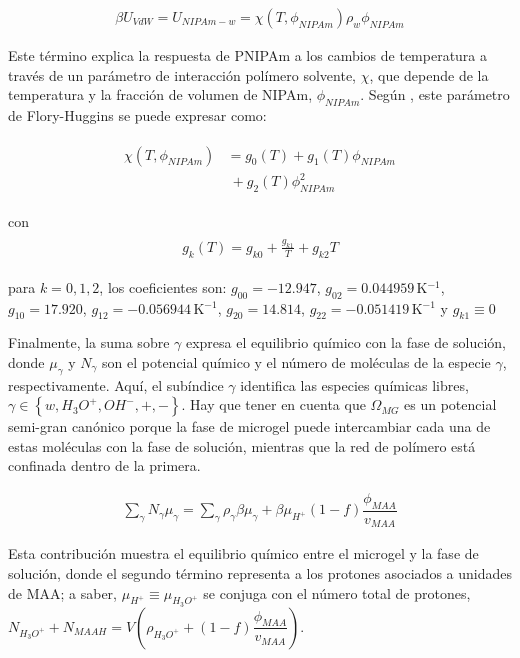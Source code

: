 \begin{align}
	\beta U_{VdW} = U_{NIPAm-w} = \chi (T, \phi_{NIPAm})\rho_w \phi_{NIPAm}
\end{align}


Este  t\'ermino explica la respuesta de PNIPAm a los cambios de temperatura a trav\'es de un par\'ametro de interacci\'on pol\'imero solvente, $\chi$, que depende de la temperatura y la fracci\'on de volumen de NIPAm, $\phi_{NIPAm}$.
Seg\'un  \citet{afroze2000}, este par\'ametro de Flory-Huggins se puede expresar como:
%
%


\begin{align}
	\begin{aligned}
		\chi (T, \phi_{NIPAm}) &=g_0(T) +g_1(T)\phi_{NIPAm} \\
		&~+ g_2(T)\phi_{NIPAm}^2
	\end{aligned}
\end{align}

\noindent con
%
%
\begin{align}
	\begin{aligned} 
		g_k(T)=g_{k0} + \frac{g_{k1}}{T} + g_{k2}T
	\end{aligned}
\end{align}


\noindent para  $k=0,1,2$, los coeficientes son: $g_{00}= -12.947$, $g_{02}=0.044959\,$K$^{-1}$, $g_{10}= 17.920$, $g_{12}= -0.056944$\,K$^{-1}$, $g_{20}= 14.814$, $g_{22}= -0.051419$\,K$^{-1}$  y $g_{k1}\equiv 0$ \cite{afroze2000}




Finalmente, la suma sobre  $\gamma$ expresa el equilibrio qu\'imico con la fase de soluci\'on, donde $\mu_\gamma$ y $N_\gamma$ son el potencial qu\'imico y el n\'umero de mol\'eculas de la especie $\gamma$, respectivamente.
Aqu\'i, el subíndice $\gamma$ identifica  las especies qu\'imicas libres, $\gamma \in \left\{ w, H_3O^+, OH^-, +,- \right\}$.
Hay que tener en cuenta que $\Omega_{MG}$ es un potencial semi-gran can\'onico porque la fase de microgel puede intercambiar cada una de estas mol\'eculas con la fase de soluci\'on, mientras que la red de pol\'imero est\'a confinada dentro de la primera.


\begin{align}
	\sum_\gamma N_\gamma \mu_\gamma = \sum_{\gamma }{\rho_\gamma\beta\mu_\gamma}
	+ \beta\mu_{H^+}(1-f)\dfrac{\phi_{MAA}}{v_{MAA}}
\end{align}

Esta contribuci\'on muestra el equilibrio qu\'imico entre el microgel y la fase de soluci\'on, donde el segundo t\'ermino representa a los protones asociados a unidades de MAA;
a saber, $\mu_{H^+}\equiv\mu_{H_3O^+}$ se conjuga con el n\'umero total de protones,
$N_{H_3O^+}+N_{MAAH}=V\left(\rho_{H_3O^+}+(1-f)\dfrac{\phi_{MAA}}{v_{MAA}}\right)$.



